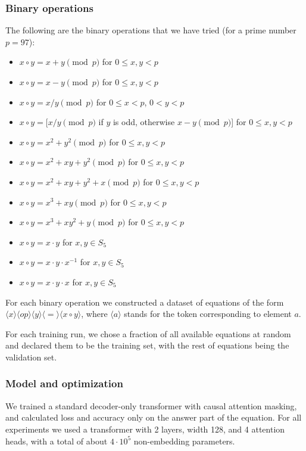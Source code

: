 \documentclass{article} %
\begin{document}
\subsubsection{Binary operations}
\label{sec:operations}
The following are the binary operations that we have tried (for a prime number $p=97$):
\begin{itemize}
    \item[] $x\circ y=x+y \pmod {p}$ for $0\leq x, y < p$
    \item[] $x\circ y=x-y \pmod {p}$ for $0\leq x, y < p$
    \item[] $x\circ y=x/y \pmod {p}$ for $0\leq x < p$, $0<y<p$
    \item[] $x\circ y=[x/y \pmod {p}$ if $y$ is odd, otherwise $x-y \pmod {p}$] for $0\leq x,y < p$
    \item[] $x\circ y=x^2+y^2 \pmod {p}$ for $0\leq x, y < p$
    \item[] $x\circ y=x^2+xy+y^2 \pmod {p}$ for $0\leq x, y < p$
    \item[] $x\circ y=x^2+xy+y^2+x \pmod {p}$ for $0\leq x, y < p$
    \item[] $x\circ y=x^3+xy \pmod {p}$ for $0\leq x, y < p$
    \item[] $x\circ y=x^3+xy^2+y \pmod {p}$ for $0\leq x, y < p$
    \item[] $x\circ y=x\cdot y$ for $x, y\in S_5$
    \item[] $x\circ y=x\cdot y\cdot x^{-1}$ for $x, y\in S_5$
    \item[] $x\circ y=x\cdot y\cdot x$ for $x, y\in S_5$
\end{itemize}

For each binary operation we constructed a dataset of equations of the form $\langle x\rangle \langle op \rangle  \langle y\rangle \langle=\rangle \langle x\circ y \rangle$, where $\langle a \rangle$ stands for the token corresponding to element $a$.

For each training run, we chose a fraction of all available equations at random and declared them to be the training set, with the rest of equations being the validation set.

\subsubsection{Model and optimization}

We trained a standard decoder-only transformer \cite{vaswani2017attention} with causal attention masking, and calculated loss and accuracy only on the answer part of the equation. For all experiments we used a transformer with 2 layers, width 128, and 4 attention heads, with a total of about $4\cdot 10^5$ non-embedding parameters.
\end{document}
